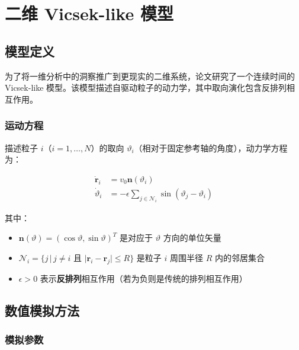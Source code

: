 
\section{二维 Vicsek-like 模型}\label{sec:2d-model}

\subsection{模型定义}

为了将一维分析中的洞察推广到更现实的二维系统，论文研究了一个连续时间的 Vicsek-like 模型\cite{boltz2025}。该模型描述自驱动粒子的动力学，其中取向演化包含反排列相互作用。

\subsubsection{运动方程}

描述粒子 $i$（$i = 1, \ldots, N$）的取向 $\vartheta_i$（相对于固定参考轴的角度），动力学方程为：

\begin{keybox}
\begin{align}
\dot{\mathbf{r}}_i &= v_0 \mathbf{n}(\vartheta_i) \label{eq:vicsek-pos}\\
\dot{\vartheta}_i &= -\epsilon \sum_{j \in \mathcal{N}_i} \sin(\vartheta_j - \vartheta_i) \label{eq:vicsek-angle}
\end{align}
\end{keybox}

其中：
\begin{itemize}
    \item $\mathbf{n}(\vartheta) = (\cos\vartheta, \sin\vartheta)^T$ 是对应于 $\vartheta$ 方向的单位矢量
    \item $\mathcal{N}_i = \{j \,|\, j \neq i \text{ 且 } |\mathbf{r}_i - \mathbf{r}_j| \leq R\}$ 是粒子 $i$ 周围半径 $R$ 内的邻居集合
    \item $\epsilon > 0$ 表示\textbf{反排列}相互作用（若为负则是传统的排列相互作用）
\end{itemize}

\subsection{数值模拟方法}

\subsubsection{模拟参数}

